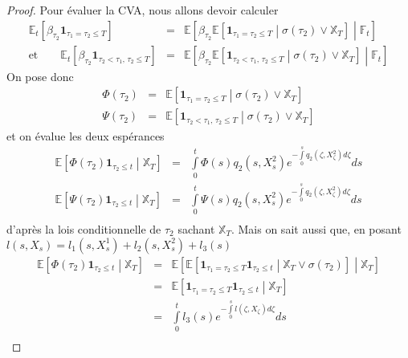 \documentclass[a4paper]{article}
\theoremstyle{definition}
\theoremstyle{remark}
\begin{document}
\begin{proof}
Pour évaluer la CVA, nous allons devoir calculer 
\begin{eqnarray*}
\mathbb{E}_t \left[ \beta_{\tau_2} \mathbf{1}_{\tau_1 = \tau_2 \leq T} \right] &=& \mathbb{E} \left[ \beta_{\tau_2} \mathbb{E} \left[ \mathbf{1}_{\tau_1 = \tau_2 \leq T} \middle| \sigma (\tau_2) \vee \mathbb{X}_T \right] \middle| \mathbb{F}_t \right] \\
\text{et} \qquad
\mathbb{E}_t \left[ \beta_{\tau_2} \mathbf{1}_{\tau_2 < \tau_1,\, \tau_2 \leq T} \right] &=& \mathbb{E} \left[ \beta_{\tau_2} \mathbb{E} \left[ \mathbf{1}_{\tau_2 < \tau_1,\, \tau_2 \leq T} \middle| \sigma (\tau_2) \vee \mathbb{X}_T \right] \middle| \mathbb{F}_t \right]
\end{eqnarray*}
On pose donc
\begin{eqnarray*}
\Phi (\tau_2) &=& \mathbb{E} \left[ \mathbf{1}_{\tau_1 = \tau_2 \leq T} \middle| \sigma (\tau_2) \vee \mathbb{X}_T \right] \\
\Psi (\tau_2) &=& \mathbb{E} \left[ \mathbf{1}_{\tau_2 < \tau_1,\, \tau_2 \leq T} \middle| \sigma (\tau_2) \vee \mathbb{X}_T \right] 
\end{eqnarray*}
et on évalue les deux espérances 
\begin{eqnarray*}
\mathbb{E} \left[ \Phi (\tau_2) \mathbf{1}_{\tau_2 \leq t} \middle| \mathbb{X}_T \right] &=& \int \limits_0^t \Phi(s) q_2(s, X^2_s)e^{-\int \limits_0^s q_2(\zeta, X^2_\zeta)d\zeta} ds \\
\mathbb{E} \left[ \Psi (\tau_2) \mathbf{1}_{\tau_2 \leq t} \middle| \mathbb{X}_T \right] &=& \int \limits_0^t \Psi(s) q_2(s, X^2_s)e^{-\int \limits_0^s q_2(\zeta, X^2_\zeta)d\zeta} ds \\
\end{eqnarray*}
d'après la lois conditionnelle de $\tau_2$ sachant $\mathbb{X}_T$. Mais on sait aussi que, en posant $l(s, X_s) = l_1(s, X^1_s) + l_2(s, X^2_s) +l_3(s)$
\begin{eqnarray*}
\mathbb{E} \left[ \Phi (\tau_2) \mathbf{1}_{\tau_2 \leq t} \middle| \mathbb{X}_T \right] &=&  \mathbb{E} \left[ \mathbb{E} \left[ \mathbf{1}_{\tau_1 = \tau_2 \leq T} \mathbf{1}_{\tau_2 \leq t} \middle| \mathbb{X}_T \vee \sigma (\tau_2) \right] \middle| \mathbb{X}_T \right] \\
&=& \mathbb{E} \left[ \mathbf{1}_{\tau_1 = \tau_2 \leq T} \mathbf{1}_{\tau_2 \leq t} \middle| \mathbb{X}_T \right] \\
&=& \int \limits_0^t l_3(s) e^{-\int \limits_0^s l(\zeta, X_\zeta) d\zeta} ds \\

\end{eqnarray*}
\end{proof}
\end{document}
